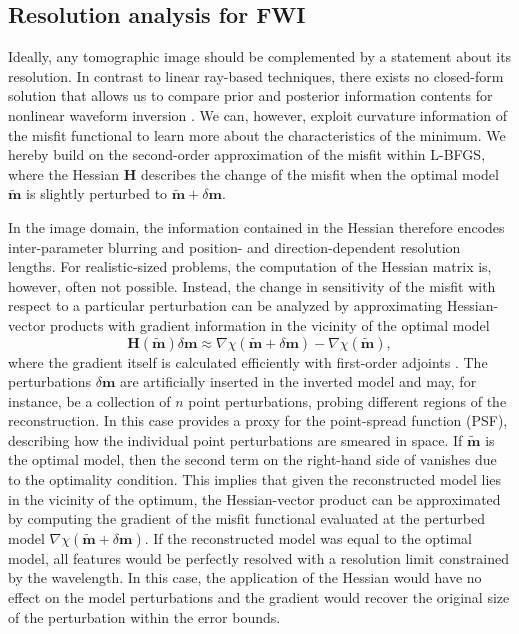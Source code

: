 \documentclass[12pt]{iopart}
\begin{document}
\subsection{Resolution analysis for FWI}
\label{subsec:resolution_analysis}
Ideally, any tomographic image should be complemented by a statement about its resolution. In contrast to linear ray-based techniques, there exists no closed-form solution that allows us to compare prior and posterior information contents for nonlinear waveform inversion \cite{Ulrich_2023}. We can, however, exploit curvature information of the misfit functional to learn more about the characteristics of the minimum. We hereby build on the second-order approximation of the misfit within L-BFGS, where the Hessian $\mathbf{H}$ describes the change of the misfit when the optimal model $\mathbf{\tilde{m}}$ is slightly perturbed to $\mathbf{\tilde{m}}+\delta\mathbf{m}$. 

In the image domain, the information contained in the Hessian therefore encodes inter-parameter blurring and position- and direction-dependent resolution lengths. For realistic-sized problems, the computation of the Hessian matrix is, however, often not possible. Instead, the change in sensitivity of the misfit with respect to a particular perturbation can be analyzed by approximating Hessian-vector products with gradient information in the vicinity of the optimal model    
\begin{equation}
	\mathbf{H}(\mathbf{\tilde{m}})\delta\mathbf{m}\approx\nabla\chi(\mathbf{\tilde{m}}+\delta\mathbf{m})-\nabla\chi(\mathbf{\tilde{m}}),
	\label{eq:Hesse-vector_product}
\end{equation}
where the gradient itself is calculated efficiently with first-order adjoints \cite{Fichtner_Trampert_2011,Fichtner_Leeuwen_2015}. The perturbations $\delta{\mathbf{m}}$ are artificially inserted in the inverted model and may, for instance, be a collection of $n$ point perturbations, probing different regions of the reconstruction. In this case  provides a proxy for the point-spread function (PSF), describing how the individual point perturbations are smeared in space. If $\mathbf{\tilde{m}}$ is the optimal model, then the second term on the right-hand side of  vanishes due to the optimality condition. This implies that given the reconstructed model lies in the vicinity of the optimum, the Hessian-vector product can be approximated by computing the gradient of the misfit functional evaluated at the perturbed model $\nabla\chi(\mathbf{\tilde{m}}+\delta\mathbf{m})$. If the reconstructed model was equal to the optimal model, all features would be perfectly resolved with a resolution limit constrained by the wavelength. In this case, the application of the Hessian would have no effect on the model perturbations and the gradient would recover the original size of the perturbation within the error bounds.   
\end{document}
